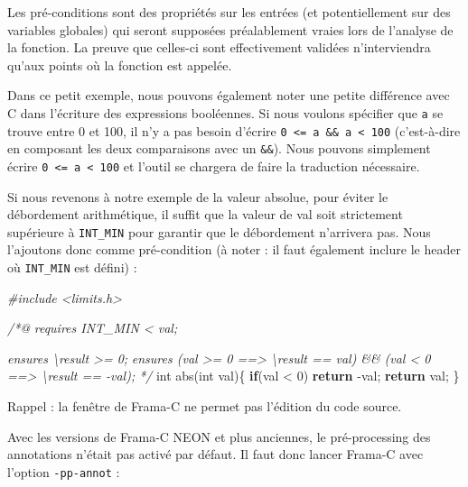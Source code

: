 \documentclass[12pt,francais,]{scrbook}
\newenvironment{Shaded}{}{}
\newcommand{\KeywordTok}[1]{\textcolor[rgb]{0.00,0.44,0.13}{\textbf{{#1}}}}
\newcommand{\DataTypeTok}[1]{\textcolor[rgb]{0.56,0.13,0.00}{{#1}}}
\newcommand{\DecValTok}[1]{\textcolor[rgb]{0.25,0.63,0.44}{{#1}}}
\newcommand{\CommentTok}[1]{\textcolor[rgb]{0.38,0.63,0.69}{\textit{{#1}}}}
\newcommand{\NormalTok}[1]{{#1}}
\newenvironment{zdsalertblock}[1]{%
  \tcolorbox[beamer,%
    noparskip,breakable,
    colback=LightCoral,colframe=DarkRed,%
    colbacklower=Tomato,%
    title=#1]
}{\endtcolorbox}
\newenvironment{zdsblock}[1]{%
  \tcolorbox[beamer,%
    noparskip,breakable,
    colback=LightBlue,colframe=DarkBlue,%
    colbacklower=DarkBlue,%
    title=#1]
}{\endtcolorbox}
\begin{document}
Les pré-conditions sont des propriétés sur les entrées (et
potentiellement sur des variables globales) qui seront supposées
préalablement vraies lors de l'analyse de la fonction. La preuve que
celles-ci sont effectivement validées n'interviendra qu'aux points où la
fonction est appelée.

Dans ce petit exemple, nous pouvons également noter une petite
différence avec C dans l'écriture des expressions booléennes. Si nous
voulons spécifier que \texttt{a} se trouve entre 0 et 100, il n'y a pas
besoin d'écrire \texttt{0\ \textless{}=\ a\ \&\&\ a\ \textless{}\ 100}
(c'est-à-dire en composant les deux comparaisons avec un \texttt{\&\&}).
Nous pouvons simplement écrire
\texttt{0\ \textless{}=\ a\ \textless{}\ 100} et l'outil se chargera de
faire la traduction nécessaire.

Si nous revenons à notre exemple de la valeur absolue, pour éviter le
débordement arithmétique, il suffit que la valeur de val soit
strictement supérieure à \texttt{INT\_MIN} pour garantir que le
débordement n'arrivera pas. Nous l'ajoutons donc comme pré-condition (à
noter : il faut également inclure le header où \texttt{INT\_MIN} est
défini) :

\begin{footnotesize}\begin{Shaded}
\begin{Highlighting}[]
\CommentTok{#include <limits.h>}

\CommentTok{/*@}
\CommentTok{  requires INT_MIN < val;}

\CommentTok{  ensures \textbackslash{}result >= 0;}
\CommentTok{  ensures (val >= 0 ==> \textbackslash{}result == val) && }
\CommentTok{          (val < 0 ==> \textbackslash{}result == -val);}
\CommentTok{*/}
\DataTypeTok{int} \NormalTok{abs(}\DataTypeTok{int} \NormalTok{val)\{}
  \KeywordTok{if}\NormalTok{(val < }\DecValTok{0}\NormalTok{) }\KeywordTok{return} \NormalTok{-val;}
  \KeywordTok{return} \NormalTok{val;}
\NormalTok{\}}
\end{Highlighting}
\end{Shaded}\end{footnotesize}

\begin{zdsalertblock}{Attention}
  Rappel : la fenêtre de Frama-C ne permet pas
  l'édition du code source.
\end{zdsalertblock}

\begin{zdsblock}{Information}
  Avec les versions de Frama-C NEON et plus anciennes, le pré-processing
  des annotations n'était pas activé par défaut. Il faut donc lancer
  Frama-C avec l'option \texttt{-pp-annot} :

  \begin{footnotesize}\begin{Shaded}
  \end{Shaded}\end{footnotesize}
\end{zdsblock}
\end{document}
